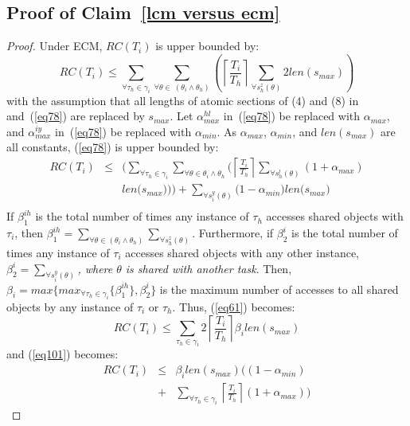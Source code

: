 \documentclass{sig-alternate}
\begin{document}
\subsection{\label{proof_lcm versus ecm}Proof of Claim~\ref{lcm versus ecm}}
\begin{proof}
Under ECM, $RC(T_{i})$ is upper bounded by:
\begin{equation}
RC(T_{i})\le\sum_{\forall \tau_{h}\in\gamma_{i}}\sum_{\forall \theta\in\ (\theta_{i}\wedge\theta_{h})}\left(\left\lceil\frac{T_{i}}{T_{h}}\right\rceil\sum_{\forall s_{h}^{z}(\theta)}2len(s_{max})\right)\label{eq61}\end{equation}
with the assumption that all lengths of atomic sections of (4) and (8) in~\cite{stmconcurrencycontrol:emsoft11} and~(\ref{eq78}) are replaced by $s_{max}$.
Let $\alpha_{max}^{hl}$ in~(\ref{eq78}) be replaced with $\alpha_{max}$, and $\alpha_{max}^{iy}$ in~(\ref{eq78}) be replaced with $\alpha_{min}$. 
As $\alpha_{max}$, $\alpha_{min}$, and $len(s_{max})$ are all constants, (\ref{eq78}) is upper bounded by:
\begin{eqnarray}
RC(T_i) & \le & \Bigg(\sum_{\forall \tau_h \in \gamma_i}\sum_{\forall\theta \in \theta_i \wedge \theta_h}\Bigg(\left\lceil\frac{T_{i}}{T_{h}}\right\rceil\sum_{\forall s_{h}^{l}(\theta)}\left(1+\alpha_{max}\right)\nonumber\\
& & len\Big(s_{max}\Big)\Bigg)\Bigg)
 +  \sum_{\forall s_{i}^{y}(\theta)}\Big(1-\alpha_{min}\Big)len\Big(s_{max}\Big)\nonumber\\ 
\label{eq101}\end{eqnarray}
%
If $\beta_1^{ih}$ is the total number of times any instance of $\tau_h$ accesses shared objects with $\tau_i$, then $\beta_1^{ih}=\sum_{\forall \theta\in(\theta_{i}\wedge\theta_{h})}\sum_{\forall s_{h}^{z}(\theta)}$. Furthermore, if $\beta_2^i$ is the total number of times any instance of $\tau_i$ accesses shared objects with any other instance,   $\beta_2^i=\sum_{\forall s_{i}^{y}(\theta)}$\textit{, where $\theta$ is shared with another task}. Then, $\beta_{i}=max\{max_{\forall \tau_h \in \gamma_i}\{\beta_1^{ih}\},\beta_2^i\}$ is the maximum number of accesses to all shared objects by any instance of $\tau_{i}$ or $\tau_{h}$. 
Thus, (\ref{eq61}) becomes:
\begin{equation}
RC(T_{i})\le\sum_{\tau_{h}\in\gamma_{i}}2\left\lceil\frac{T_{i}}{T_{h}}\right\rceil\beta_{i}len(s_{max})
\label{eq63}\end{equation}
and (\ref{eq101}) becomes:
\begin{eqnarray}
RC(T_{i}) & \le & \beta_{i}len(s_{max}) \Bigg((1-\alpha_{min})\nonumber\\
& + & \sum_{\forall \tau_h \in \gamma_i}\left\lceil\frac{T_{i}}{T_{h}}\right\rceil(1+\alpha_{max})\Bigg)
\label{eq102}\end{eqnarray}


\end{proof}
\end{document}
